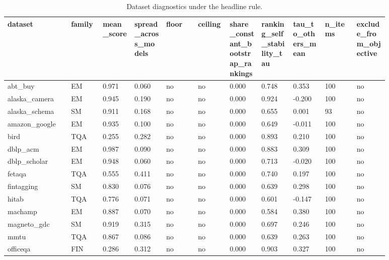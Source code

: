 \begin{landscape}
\tiny
\setlength{\tabcolsep}{3pt}
\begin{longtable}{p{0.147\linewidth}p{0.073\linewidth}p{0.073\linewidth}p{0.073\linewidth}p{0.073\linewidth}p{0.073\linewidth}p{0.073\linewidth}p{0.073\linewidth}p{0.073\linewidth}p{0.073\linewidth}p{0.073\linewidth}}
\caption{Dataset diagnostics under the headline rule.}\label{tab:diagnostics}\\
\toprule
dataset & family & mean\_\allowbreak{}score & spread\_\allowbreak{}across\_\allowbreak{}models & floor & ceiling & share\_\allowbreak{}constant\_\allowbreak{}bootstrap\_\allowbreak{}rankings & ranking\_\allowbreak{}self\_\allowbreak{}stability\_\allowbreak{}tau & tau\_\allowbreak{}to\_\allowbreak{}others\_\allowbreak{}mean & n\_\allowbreak{}items & exclude\_\allowbreak{}from\_\allowbreak{}objective \\
\midrule
abt\_\allowbreak{}buy & EM & 0.971 & 0.060 & no & no & 0.000 & 0.748 & 0.353 & 100 & no \\
alaska\_\allowbreak{}camera & EM & 0.945 & 0.190 & no & no & 0.000 & 0.924 & -0.200 & 100 & no \\
alaska\_\allowbreak{}schema & SM & 0.911 & 0.168 & no & no & 0.000 & 0.655 & 0.001 & 93 & no \\
amazon\_\allowbreak{}google & EM & 0.935 & 0.100 & no & no & 0.000 & 0.649 & -0.011 & 100 & no \\
bird & TQA & 0.255 & 0.282 & no & no & 0.000 & 0.893 & 0.210 & 100 & no \\
dblp\_\allowbreak{}acm & EM & 0.987 & 0.090 & no & no & 0.000 & 0.883 & 0.309 & 100 & no \\
dblp\_\allowbreak{}scholar & EM & 0.948 & 0.060 & no & no & 0.000 & 0.713 & -0.020 & 100 & no \\
fetaqa & TQA & 0.555 & 0.411 & no & no & 0.000 & 0.740 & 0.197 & 100 & no \\
fintagging & SM & 0.830 & 0.076 & no & no & 0.000 & 0.639 & 0.298 & 100 & no \\
hitab & TQA & 0.776 & 0.071 & no & no & 0.000 & 0.601 & -0.147 & 100 & no \\
machamp & EM & 0.887 & 0.070 & no & no & 0.000 & 0.584 & 0.380 & 100 & no \\
magneto\_\allowbreak{}gdc & SM & 0.919 & 0.315 & no & no & 0.000 & 0.697 & 0.246 & 100 & no \\
mmtu & TQA & 0.867 & 0.086 & no & no & 0.000 & 0.639 & 0.263 & 100 & no \\
officeqa & FIN & 0.286 & 0.312 & no & no & 0.000 & 0.903 & 0.327 & 100 & no \\

\end{longtable}
\end{landscape}
